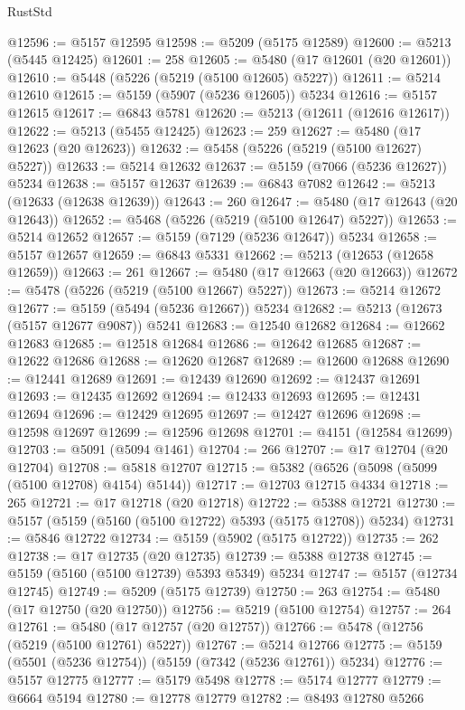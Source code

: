 \begin{lexlean}{RustStd}
\begin{coremodule}
@12596 := @5157 @12595
@12598 := @5209 (@5175 @12589)
@12600 := @5213 (@5445 @12425)
@12601 := 258
@12605 := @5480 (@17 @12601 (@20 @12601))
@12610 := @5448 (@5226 (@5219 (@5100 @12605) @5227))
@12611 := @5214 @12610
@12615 := @5159 (@5907 (@5236 @12605)) @5234
@12616 := @5157 @12615
@12617 := @6843 @5781
@12620 := @5213 (@12611 (@12616 @12617))
@12622 := @5213 (@5455 @12425)
@12623 := 259
@12627 := @5480 (@17 @12623 (@20 @12623))
@12632 := @5458 (@5226 (@5219 (@5100 @12627) @5227))
@12633 := @5214 @12632
@12637 := @5159 (@7066 (@5236 @12627)) @5234
@12638 := @5157 @12637
@12639 := @6843 @7082
@12642 := @5213 (@12633 (@12638 @12639))
@12643 := 260
@12647 := @5480 (@17 @12643 (@20 @12643))
@12652 := @5468 (@5226 (@5219 (@5100 @12647) @5227))
@12653 := @5214 @12652
@12657 := @5159 (@7129 (@5236 @12647)) @5234
@12658 := @5157 @12657
@12659 := @6843 @5331
@12662 := @5213 (@12653 (@12658 @12659))
@12663 := 261
@12667 := @5480 (@17 @12663 (@20 @12663))
@12672 := @5478 (@5226 (@5219 (@5100 @12667) @5227))
@12673 := @5214 @12672
@12677 := @5159 (@5494 (@5236 @12667)) @5234
@12682 := @5213 (@12673 (@5157 @12677 @9087)) @5241
@12683 := @12540 @12682
@12684 := @12662 @12683
@12685 := @12518 @12684
@12686 := @12642 @12685
@12687 := @12622 @12686
@12688 := @12620 @12687
@12689 := @12600 @12688
@12690 := @12441 @12689
@12691 := @12439 @12690
@12692 := @12437 @12691
@12693 := @12435 @12692
@12694 := @12433 @12693
@12695 := @12431 @12694
@12696 := @12429 @12695
@12697 := @12427 @12696
@12698 := @12598 @12697
@12699 := @12596 @12698
@12701 := @4151 (@12584 @12699)
@12703 := @5091 (@5094 @1461)
@12704 := 266
@12707 := @17 @12704 (@20 @12704)
@12708 := @5818 @12707
@12715 := @5382 (@6526 (@5098 (@5099 (@5100 @12708) @4154) @5144))
@12717 := @12703 @12715 @4334
@12718 := 265
@12721 := @17 @12718 (@20 @12718)
@12722 := @5388 @12721
@12730 := @5157 (@5159 (@5160 (@5100 @12722) @5393 (@5175 @12708)) @5234)
@12731 := @5846 @12722
@12734 := @5159 (@5902 (@5175 @12722))
@12735 := 262
@12738 := @17 @12735 (@20 @12735)
@12739 := @5388 @12738
@12745 := @5159 (@5160 (@5100 @12739) @5393 @5349) @5234
@12747 := @5157 (@12734 @12745)
@12749 := @5209 (@5175 @12739)
@12750 := 263
@12754 := @5480 (@17 @12750 (@20 @12750))
@12756 := @5219 (@5100 @12754)
@12757 := 264
@12761 := @5480 (@17 @12757 (@20 @12757))
@12766 := @5478 (@12756 (@5219 (@5100 @12761) @5227))
@12767 := @5214 @12766
@12775 := @5159 (@5501 (@5236 @12754)) (@5159 (@7342 (@5236 @12761)) @5234)
@12776 := @5157 @12775
@12777 := @5179 @5498
@12778 := @5174 @12777
@12779 := @6664 @5194
@12780 := @12778 @12779
@12782 := @8493 @12780 @5266

\end{coremodule}
\end{lexlean}
